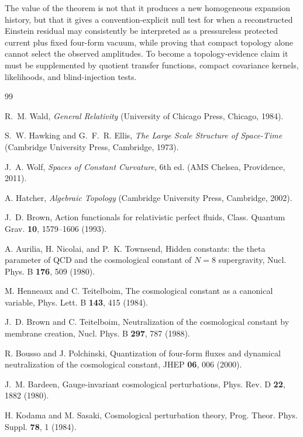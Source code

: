 \documentclass[
  aps,
  prd,
  reprint,
  superscriptaddress,
  floatfix,
  nofootinbib,
  longbibliography
]{revtex4-2}
\theoremstyle{plain}
\theoremstyle{definition}
\theoremstyle{remark}
\begin{document}
The value of the theorem is not that it produces a new homogeneous expansion
history, but that it gives a convention-explicit null test for when a
reconstructed Einstein residual may consistently be interpreted as a
pressureless protected current plus fixed four-form vacuum, while proving that
compact topology alone cannot select the observed amplitudes.  To become a
topology-evidence claim it must be supplemented by quotient transfer functions,
compact covariance kernels, likelihoods, and blind-injection tests.

\begin{thebibliography}{99}

R.~M. Wald, \emph{General Relativity} (University of Chicago Press, Chicago, 1984).

S.~W. Hawking and G.~F.~R. Ellis, \emph{The Large Scale Structure of Space-Time}
(Cambridge University Press, Cambridge, 1973).

J.~A. Wolf, \emph{Spaces of Constant Curvature}, 6th ed. (AMS Chelsea,
Providence, 2011).

A. Hatcher, \emph{Algebraic Topology} (Cambridge University Press, Cambridge, 2002).

J.~D. Brown, Action functionals for relativistic perfect fluids,
Class. Quantum Grav. \textbf{10}, 1579--1606 (1993).


A. Aurilia, H. Nicolai, and P.~K. Townsend,
Hidden constants: the theta parameter of QCD and the cosmological constant of
\(N=8\) supergravity, Nucl. Phys. B \textbf{176}, 509 (1980).

M. Henneaux and C. Teitelboim,
The cosmological constant as a canonical variable,
Phys. Lett. B \textbf{143}, 415 (1984).

J.~D. Brown and C. Teitelboim,
Neutralization of the cosmological constant by membrane creation,
Nucl. Phys. B \textbf{297}, 787 (1988).

R. Bousso and J. Polchinski,
Quantization of four-form fluxes and dynamical neutralization of the cosmological constant,
JHEP \textbf{06}, 006 (2000).

J.~M. Bardeen, Gauge-invariant cosmological perturbations,
Phys. Rev. D \textbf{22}, 1882 (1980).

H. Kodama and M. Sasaki, Cosmological perturbation theory,
Prog. Theor. Phys. Suppl. \textbf{78}, 1 (1984).


\end{thebibliography}
\end{document}
